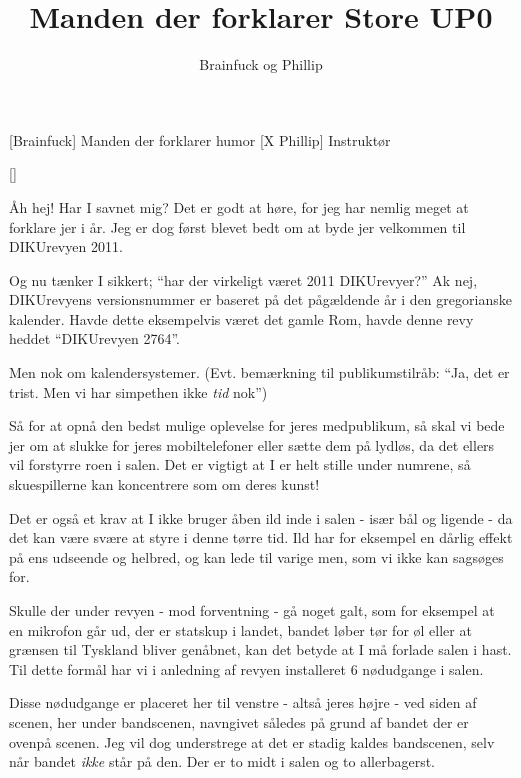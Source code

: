 \documentclass[a4paper,11pt]{article}
\title{Manden der forklarer Store UP0}
\author{Brainfuck og Phillip}
\begin{document}
 \maketitle

 \begin{roles}
[Brainfuck] Manden der forklarer humor
[X Phillip] Instruktør
 \end{roles}
 
 \begin{props}
\prop{}[]
 \end{props}

 \begin{sketch}
 

 Åh hej!  Har I savnet mig?  Det er godt at høre, for jeg har nemlig meget at forklare jer i år.  Jeg er dog først blevet bedt om at byde jer velkommen til DIKUrevyen 2011.

 Og nu tænker I sikkert; ``har der virkeligt været 2011 DIKUrevyer?''   Ak nej, DIKUrevyens versionsnummer er baseret på det pågældende år i den gregorianske kalender. Havde dette eksempelvis været det gamle Rom, havde denne revy heddet ``DIKUrevyen 2764''.

 Men nok om kalendersystemer. (Evt. bemærkning til publikumstilråb: ``Ja, det er trist. Men vi har simpethen ikke \emph{tid} nok'')

 Så for at opnå den bedst mulige oplevelse for jeres medpublikum, så skal vi bede jer om at slukke for jeres mobiltelefoner eller sætte dem på lydløs, da det ellers vil forstyrre roen i salen. Det er vigtigt at I er helt stille under numrene, så skuespillerne kan koncentrere som om deres kunst!

 Det er også et krav at I ikke bruger åben ild inde i salen - især bål og ligende - da det kan være svære at styre i denne tørre tid.  Ild har for eksempel en dårlig effekt på ens udseende og helbred, og kan lede til varige men, som vi ikke kan sagsøges for.

 Skulle der under revyen - mod forventning - gå noget galt, som for eksempel at en mikrofon går ud, der er statskup i landet, bandet løber tør for øl eller at grænsen til Tyskland bliver genåbnet, kan det betyde at I må forlade salen i hast. Til dette formål har vi i anledning af revyen installeret 6 nødudgange i salen.

 Disse nødudgange er placeret her til venstre - altså jeres højre - ved siden af scenen, her under bandscenen, navngivet således på grund af bandet der er ovenpå scenen.  Jeg vil dog understrege at det er stadig kaldes bandscenen, selv når bandet \emph{ikke} står på den.  Der er to midt i salen og to allerbagerst.


\end{sketch}
\end{document}
